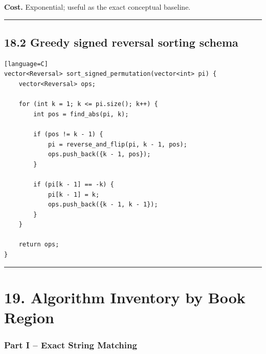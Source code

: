 \documentclass[11pt]{article}
\begin{document}
\textbf{Cost.} Exponential; useful as the exact conceptual baseline.

\begin{center}\rule{0.5\linewidth}{0.5pt}\end{center}

\subsection{18.2 Greedy signed reversal sorting schema}\label{greedy-signed-reversal-sorting-schema}

\begin{verbatim}[language=C]
vector<Reversal> sort_signed_permutation(vector<int> pi) {
    vector<Reversal> ops;

    for (int k = 1; k <= pi.size(); k++) {
        int pos = find_abs(pi, k);

        if (pos != k - 1) {
            pi = reverse_and_flip(pi, k - 1, pos);
            ops.push_back({k - 1, pos});
        }

        if (pi[k - 1] == -k) {
            pi[k - 1] = k;
            ops.push_back({k - 1, k - 1});
        }
    }

    return ops;
}
\end{verbatim}

\begin{center}\rule{0.5\linewidth}{0.5pt}\end{center}

\section{19. Algorithm Inventory by Book Region}\label{algorithm-inventory-by-book-region}

\subsubsection{Part I -- Exact String Matching}\label{part-i-exact-string-matching}
\end{document}
